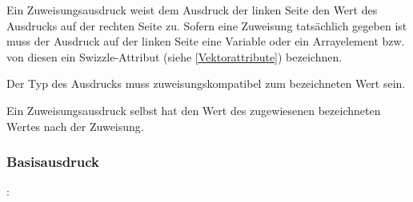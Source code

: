 Ein Zuweisungsausdruck  weist dem Ausdruck der linken Seite den Wert des Ausdrucks
auf der rechten Seite zu. Sofern eine Zuweisung tatsächlich gegeben ist muss
der Ausdruck auf der linken Seite eine Variable oder ein Arrayelement
bzw. von diesen ein Swizzle-Attribut (siehe \ref{Vektorattribute}) bezeichnen.

Der Typ des Ausdrucks muss zuweisungskompatibel zum bezeichneten Wert
sein.

Ein Zuweisungsausdruck selbst hat den Wert des zugewiesenen bezeichneten Wertes nach der Zuweisung.

\subsubsection{Basisausdruck}\label{Basisausdruck}
:\label{asdr_basis}\\
\hspace*{1cm}\glq\Gt{(}\grq  {}  \glq\Gt{)}\grq \\
\hspace*{1cm}\glq\Gt{(}\grq  {}  \glq\Gt{)}\grq {} \\
\hspace*{1cm} \\
\hspace*{1cm}  \\
\hspace*{1cm} \\
\hspace*{1cm}  \\
\hspace*{1cm} \\
\hspace*{1cm}  \\
